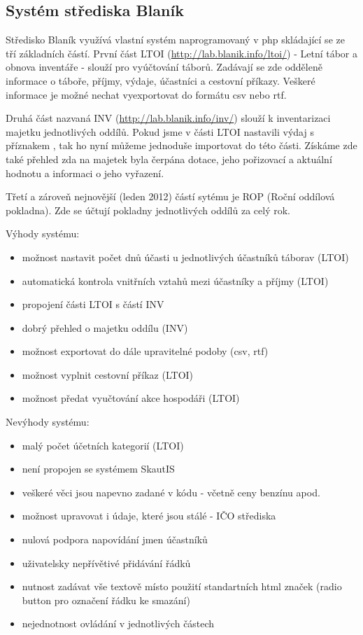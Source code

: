\documentclass[thesis=B,czech]{FITthesis}[2011/06/14]
\begin{document}
\subsection{Systém střediska Blaník}
Středisko Blaník využívá vlastní systém naprogramovaný v php skládající se ze tří základních částí. První část LTOI (\url{http://lab.blanik.info/ltoi/}) - Letní tábor a obnova inventáře - slouží pro vyúčtování táborů. Zadávají se zde odděleně informace o táboře, příjmy, výdaje, účastníci a cestovní příkazy. Veškeré informace je možné nechat vyexportovat do formátu csv nebo rtf.

Druhá část nazvaná INV (\url{http://lab.blanik.info/inv/}) slouží k inventarizaci majetku jednotlivých oddílů. Pokud jsme v části LTOI nastavili výdaj s příznakem , tak ho nyní můžeme jednoduše importovat do této části. Získáme zde také přehled zda na majetek byla čerpána dotace, jeho pořizovací a aktuální hodnotu a informaci o jeho vyřazení.

Třetí a zároveň nejnovější (leden 2012) částí sytému je ROP (Roční oddílová pokladna). Zde se účtují pokladny jednotlivých oddílů za celý rok. 

Výhody systému:
\begin{itemize}
	\item možnost nastavit počet dnů účasti u jednotlivých účastníků táborav (LTOI)
	\item automatická kontrola vnitřních vztahů mezi účastníky a příjmy (LTOI)
	\item propojení části LTOI s částí INV 
	\item dobrý přehled o majetku oddílu (INV)
	\item možnost exportovat do dále upravitelné podoby (csv, rtf)
	\item možnost vyplnit cestovní příkaz (LTOI)
	\item možnost předat vyučtování akce hospodáři (LTOI)
\end{itemize}
Nevýhody systému:
\begin{itemize}
	\item malý počet účetních kategorií (LTOI)
	\item není propojen se systémem SkautIS
	\item veškeré věci jsou napevno zadané v kódu - včetně ceny benzínu apod.
	\item možnost upravovat i údaje, které jsou stálé - IČO střediska
	\item nulová podpora napovídání jmen účastníků
	\item uživatelsky nepřívětivé přidávání řádků
	\item nutnost zadávat vše textově místo použití standartních html značek (radio button pro označení řádku ke smazání)
	\item nejednotnost ovládání v jednotlivých částech 
\end{itemize}
\end{document}
